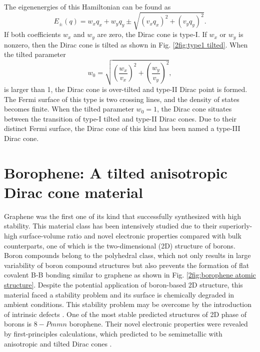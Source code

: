     The eigenenergies of this Hamiltonian can be found as
    \begin{equation} \label{2eq:eigenenergies}
        E_{\pm}(q) = w_{x}q_x + w_{y}q_y \pm \sqrt{(v_x q_x)^2 + (v_y q_y)^2}.
    \end{equation}
    If both coefficients $w_{x}$ and $w_{y}$ are zero, the Dirac cone is type-I.
    If $w_{x}$ or $w_{y}$ is nonzero, then the Dirac cone is tilted as shown in Fig. \ref{2fig:type1 tilted}.
    When the tilted parameter
    \begin{equation} \label{2eq:tilted parameter}
        w_0 = \sqrt{\left(\frac{w_x}{v_x}\right)^2 + \left(\frac{w_y}{v_y}\right)^2},
    \end{equation}
    is larger than 1, the Dirac cone is over-tilted and type-II Dirac point is formed.
    The Fermi surface of this type is two crossing lines, and the density of states becomes finite.
    When the tilted parameter $w_0 = 1$, the Dirac cone situates between the transition of type-I tilted and type-II Dirac cones.
    Due to their distinct Fermi surface, the Dirac cone of this kind has been named a type-III Dirac cone.

\section{Borophene: A tilted anisotropic Dirac cone material}
    Graphene was the first one of its kind that successfully synthesized with high stability.
    This material class has been intensively studied due to their superiorly-high surface-volume ratio and novel electronic properties compared with bulk counterparts, one of which is the two-dimensional (2D) structure of borons.
    Boron compounds belong to the polyhedral class, which not only results in large variability of boron compound structures but also prevents the formation of flat covalent B-B bonding similar to graphene as shown in Fig. \ref{2fig:borophene atomic structure}.
    Despite the potential application of boron-based 2D structure, this material faced a stability problem and its surface is chemically degraded in ambient conditions.
    This stability problem may be overcome by the introduction of intrinsic defects \cite{Liu2013}.
    One of the most stable predicted structures of 2D phase of borons is $8-Pmmn$ borophene.
    Their novel electronic properties were revealed by first-principles calculations, which predicted to be semimetallic with anisotropic and tilted Dirac cones \cite{Zhou2014,Lopez-Bezanilla2016}.
    
